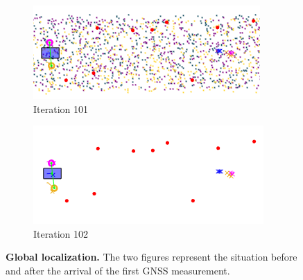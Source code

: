 \documentclass[letterpaper,twocolumn,10pt]{article}
\begin{document}
\begin{figure}[!h]
\centering
     \begin{subfigure}[b]{0.40\textwidth}
         \centering
         \includegraphics[width=\textwidth]{images/global_medium_noise_4_touse.png}
         \caption{Iteration 101}
         \label{fig:9a}
     \end{subfigure}
     \hfill
     \begin{subfigure}[b]{0.40\textwidth}
         \centering
         \includegraphics[width=\textwidth]{images/global_medium_noise_5_touse.png}
         \caption{Iteration 102}
         \label{fig:9b}
     \end{subfigure}
     \caption{\textbf{Global localization.} The two figures represent the situation before and after the arrival of the first GNSS measurement. }
     \label{fig:9}
\end{figure}
\end{document}
